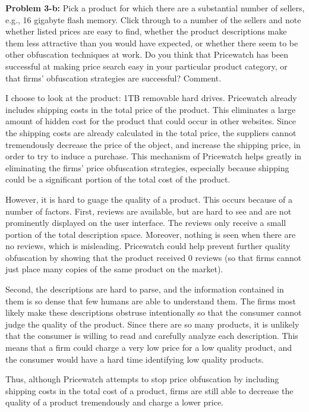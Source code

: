 \documentclass[psamsfonts]{amsart}
\newenvironment{sol}{\vspace{0.25cm}{\large \bfseries Solution:}}{\qedsymbol}
\newenvironment{prob}[1]{\begin{framed}{\large \bfseries Problem #1:}}{\end{framed}}
\begin{document}
\begin{prob}{3-b}
Pick a product for which there are a substantial number of sellers, e.g., 16 gigabyte flash memory.  Click through to a number of the sellers and note whether listed prices are easy to find, whether the product descriptions make them less attractive than you would have expected, or whether there seem to be other obfuscation techniques at work.  Do you think that Pricewatch has been successful at making price search easy in your particular product category, or that firms’ obfuscation strategies are successful?  Comment.
\end{prob}
\begin{sol}
I choose to look at the product: 1TB removable hard drives. Pricewatch already includes shipping costs in the total price of the product. This eliminates a large amount of hidden cost for the product that could occur in other websites. Since the shipping costs are already calculated in the total price, the suppliers cannot tremendously decrease the price of the object, and increase the shipping price, in order to try to induce a purchase. This mechanism of Pricewatch helps greatly in eliminating the firms' price obfuscation strategies, especially because shipping could be a significant portion of the total cost of the product.

However, it is hard to guage the quality of a product. This occurs because of a number of factors. First, reviews are available, but are hard to see and are not prominently displayed on the user interface. The reviews only receive a small portion of the total description space. Moreover, nothing is seen when there are no reviews, which is misleading. Pricewatch could help prevent further quality obfuscation by showing that the product received 0 reviews (so that firms cannot just place many copies of the same product on the market).

Second, the descriptions are hard to parse, and the information contained in them is so dense that few humans are able to understand them. The firms most likely make these descriptions obstruse intentionally so that the consumer cannot judge the quality of the product. Since there are so many products, it is unlikely that the consumer is willing to read and carefully analyze each description. This means that a firm could charge a very low price for a low quality product, and the consumer would have a hard time identifying low quality products.

Thus, although Pricewatch attempts to stop price obfuscation by including shipping costs in the total cost of a product, firms are still able to decrease the quality of a product tremendously and charge a lower price.
\end{sol}
\end{document}
